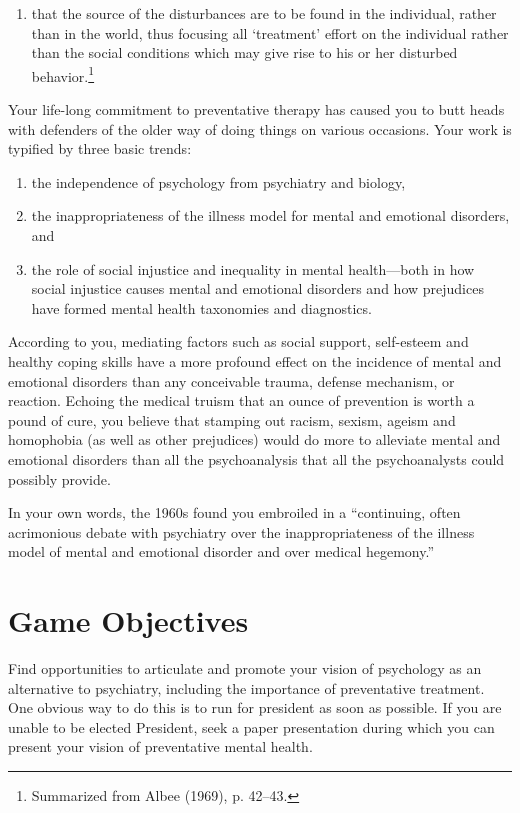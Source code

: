 \begin{refsection}
\begin{enumerate}
\item that the source of the disturbances are to be found in the individual, rather than in the world, thus focusing all ‘treatment’ effort on the individual rather than the social conditions which may give rise to his or her disturbed behavior.\footnote{Summarized from Albee (1969), p. 42--43.}

\end{enumerate}

Your life-long commitment to preventative therapy has caused you to butt heads with defenders of the older way of doing things on various occasions. Your work is typified by three basic trends: 

\begin{enumerate}
\item the independence of psychology from psychiatry and biology, 

\item the inappropriateness of the illness model for mental and emotional disorders, and 

\item the role of social injustice and inequality in mental health—both in how social injustice causes mental and emotional disorders and how prejudices have formed mental health taxonomies and diagnostics.

\end{enumerate}

According to you, mediating factors such as social support, self-esteem and healthy coping skills have a more profound effect on the incidence of mental and emotional disorders than any conceivable trauma, defense mechanism, or reaction. Echoing the medical truism that an ounce of prevention is worth a pound of cure, you believe that stamping out racism, sexism, ageism and homophobia (as well as other prejudices) would do more to alleviate mental and emotional disorders than all the psychoanalysis that all the psychoanalysts could possibly provide.

In your own words, the 1960s found you embroiled in a “continuing, often acrimonious debate with psychiatry over the inappropriateness of the illness model of mental and emotional disorder and over medical hegemony.”

\section{Game Objectives}
\label{gameobjectives}

Find opportunities to articulate and promote your vision of psychology as an alternative to psychiatry, including the importance of preventative treatment. One obvious way to do this is to run for president as soon as possible. If you are unable to be elected President, seek a paper presentation during which you can present your vision of preventative mental health.


\end{refsection}
